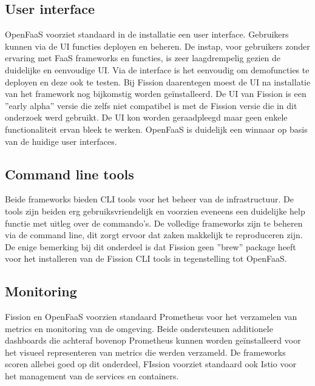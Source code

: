 \subsection{User interface}
OpenFaaS voorziet standaard in de installatie een user interface. Gebruikers kunnen via de UI functies deployen en beheren. De instap, voor gebruikers zonder ervaring met FaaS  frameworks en functies, is zeer laagdrempelig gezien de duidelijke en eenvoudige UI. Via de interface is het eenvoudig om demofuncties te deployen en deze ook te testen. Bij Fission daarentegen moest de UI na installatie van het framework nog bijkomstig worden geïnstalleerd. De UI van Fission is een ''early alpha'' versie die zelfs niet compatibel is met de Fission versie die in dit onderzoek werd gebruikt. De UI kon worden geraadpleegd maar geen enkele functionaliteit ervan bleek te werken. OpenFaaS is duidelijk een winnaar op basis van de huidige user interfaces.

\subsection{Command line tools}
Beide frameworks bieden CLI tools voor het beheer van de infrastructuur. De tools zijn beiden erg gebruiksvriendelijk en voorzien eveneens een duidelijke help functie met uitleg over de commando's. De volledige frameworks zijn te beheren via de command line, dit zorgt ervoor dat zaken makkelijk te reproduceren zijn. De enige bemerking bij dit onderdeel is dat Fission geen ''brew'' package heeft voor het installeren van de Fission CLI tools in tegenstelling tot OpenFaaS.

\subsection{Monitoring}
Fission en OpenFaaS voorzien standaard Prometheus voor het verzamelen van metrics en monitoring van de omgeving. Beide ondersteunen additionele dashboards die achteraf bovenop Prometheus kunnen worden geïnstalleerd voor het visueel representeren van metrics die werden verzameld. De frameworks scoren allebei goed op dit onderdeel, FIssion voorziet standaard ook Istio voor het management van de services en containers.

